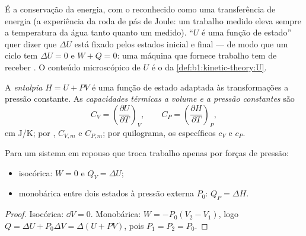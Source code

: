 \begin{remark}\label{rem:b1:first-law:meaning}
É a conservação da energia, com o  reconhecido como uma transferência
de energia (a experiência da roda de pás de Joule: um trabalho medido eleva
sempre a temperatura da água tanto quanto um  medido). ``$U$ é uma
função de estado'' quer dizer que $\Delta U$ está fixado pelos estados
inicial e final --- de modo que um ciclo tem $\Delta U = 0$ e $W + Q = 0$: uma
máquina que fornece trabalho tem de receber . O conteúdo microscópico
de $U$ é o da \cref{def:b1:kinetic-theory:U}.
\end{remark}

\begin{definition}\label{def:b1:first-law:enthalpy}
A \emph{entalpia} $H = U + PV$ é uma função de estado adaptada às
transformações a pressão constante. As \emph{capacidades térmicas a volume
e a pressão constantes} são
\[
C_V = \left(\frac{\partial U}{\partial T}\right)_V, \qquad
C_P = \left(\frac{\partial H}{\partial T}\right)_P ,
\]
em \unit{J/K}; por , $C_{V,m}$ e $C_{P,m}$; por quilograma, os 
específicos $c_V$ e $c_P$.
\end{definition}

\begin{proposition}\label{prop:b1:first-law:qvqp}
Para um sistema em repouso que troca trabalho apenas por forças de pressão:
\begin{itemize}
  \item {} isocórica: $W = 0$ e $Q_V = \Delta U$;
  \item {} monobárica entre dois estados à pressão externa
        $P_0$: $Q_P = \Delta H$.
\end{itemize}
\end{proposition}

\begin{proof}
Isocórica: $\dd V = 0$. Monobárica: $W = -P_0(V_2 - V_1)$, logo $Q = \Delta U +
P_0\Delta V = \Delta(U + PV)$, pois $P_1 = P_2 = P_0$.
\end{proof}


